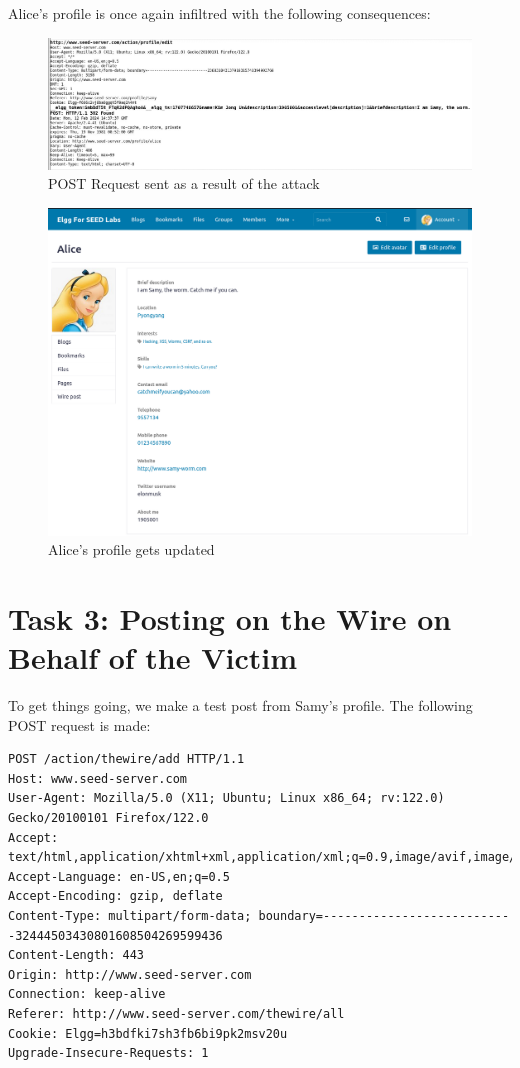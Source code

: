 \documentclass[12pt]{article}
\begin{document}
Alice's profile is once again infiltred with the following consequences:
     \begin{figure}[H]
         \centering
         \includegraphics[width=\textwidth]{Images/ss8.png}
         \caption{POST Request sent as a result of the attack}
         \label{fig:ss8}
     \end{figure}
     \begin{figure}[H]
         \centering
         \includegraphics[width=\textwidth]{Images/ss3.png}
         \caption{Alice's profile gets updated}
         \label{fig:ss3}
     \end{figure}

\newpage


\section*{Task 3: Posting on the Wire on Behalf of the Victim}
To get things going, we make a test post from Samy's profile. The following POST request is made:

\begin{verbatim}
POST /action/thewire/add HTTP/1.1
Host: www.seed-server.com
User-Agent: Mozilla/5.0 (X11; Ubuntu; Linux x86_64; rv:122.0) Gecko/20100101 Firefox/122.0
Accept: text/html,application/xhtml+xml,application/xml;q=0.9,image/avif,image/webp,*/*;q=0.8
Accept-Language: en-US,en;q=0.5
Accept-Encoding: gzip, deflate
Content-Type: multipart/form-data; boundary=---------------------------32444503430801608504269599436
Content-Length: 443
Origin: http://www.seed-server.com
Connection: keep-alive
Referer: http://www.seed-server.com/thewire/all
Cookie: Elgg=h3bdfki7sh3fb6bi9pk2msv20u
Upgrade-Insecure-Requests: 1
\end{verbatim}
\end{document}
